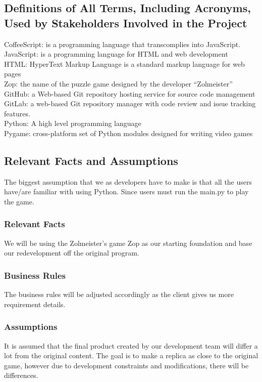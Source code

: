 \documentclass[12pt]{article}
\begin{document}
\subsection{Definitions of All Terms, Including Acronyms, Used by Stakeholders Involved in the Project}
CoffeeScript: is a programming language that transcomplies into JavaScript.\\
JavaScript: is a programming language for HTML and web development\\
HTML: HyperText Markup Language is a standard markup language for web pages\\
Zop: the name of the puzzle game designed by the developer “Zolmeister”\\
GitHub: a Web-based Git repository hosting service for source code management\\
GitLab: a web-based Git repository manager with code review and issue tracking features.\\
Python: A high level programming language\\
Pygame: cross-platform set of Python modules designed for writing video games\\


\subsection{Relevant Facts and Assumptions}
The biggest assumption that we as developers have to make is that all the users have/are familiar with using Python. Since users must run the main.py to play the game.

\subsubsection{Relevant Facts}
We will be using the Zolmeister’s game Zop as our starting foundation and base our redevelopment off the original program.
\subsubsection{Business Rules}
The business rules will be adjusted accordingly as the client gives us more requirement details. 
\subsubsection{Assumptions}
It is assumed that the final product created by our development team will differ a lot from the original content. The goal is to make a replica as close to the original game, however due to development constraints and modifications, there will be differences. 
\end{document}

